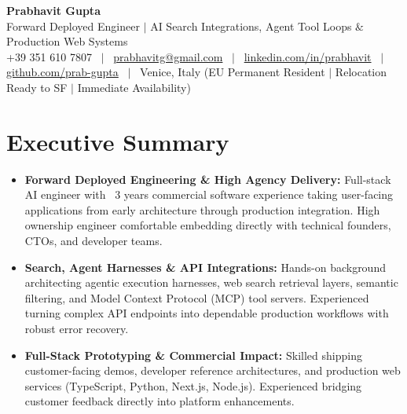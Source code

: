 \documentclass[a4paper,10pt]{article}
\begin{document}
\begin{minipage}[c]{0.80\textwidth}
  {\Huge\bfseries Prabhavit Gupta}\\[3pt]
  {\color{accent}\large Forward Deployed Engineer $\vert$ AI Search Integrations, Agent Tool Loops $\&$ Production Web Systems}\\[6pt]
  {\footnotesize +39 351 610 7807 ~$\vert$~
  \href{mailto:prabhavitg@gmail.com}{prabhavitg@gmail.com} ~$\vert$~
  \href{https://www.linkedin.com/in/prabhavit/}{linkedin.com/in/prabhavit} ~$\vert$~
  \href{https://github.com/prab-gupta}{github.com/prab-gupta} ~$\vert$~
  Venice, Italy (EU Permanent Resident $\vert$ Relocation Ready to SF $\vert$ Immediate Availability)}
\end{minipage}\hfill

\vspace{6pt}

\section{Executive Summary}
\begin{itemize}
  \item \textbf{Forward Deployed Engineering \& High Agency Delivery:} Full-stack AI engineer with ~3 years commercial software experience taking user-facing applications from early architecture through production integration. High ownership engineer comfortable embedding directly with technical founders, CTOs, and developer teams.
  \item \textbf{Search, Agent Harnesses \& API Integrations:} Hands-on background architecting agentic execution harnesses, web search retrieval layers, semantic filtering, and Model Context Protocol (MCP) tool servers. Experienced turning complex API endpoints into dependable production workflows with robust error recovery.
  \item \textbf{Full-Stack Prototyping \& Commercial Impact:} Skilled shipping customer-facing demos, developer reference architectures, and production web services (TypeScript, Python, Next.js, Node.js). Experienced bridging customer feedback directly into platform enhancements.
\end{itemize}

\end{document}

